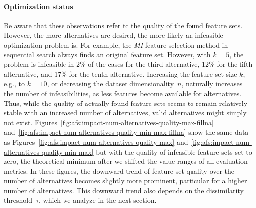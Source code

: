 \documentclass{article}
\theoremstyle{definition}
\begin{document}
\paragraph{Optimization status}

Be aware that these observations refer to the quality of the found feature sets.
However, the more alternatives are desired, the more likely an infeasible optimization problem is.
For example, the \emph{MI} feature-selection method in sequential search always finds an original feature set.
However, with $k=5$, the problem is infeasible in 2\% of the cases for the third alternative, 12\% for the fifth alternative, and 17\% for the tenth alternative.
Increasing the feature-set size $k$, e.g., to $k=10$, or decreasing the dataset dimensionality~$n$, naturally increases the number of infeasibilities, as less features become available for alternatives.
Thus, while the quality of actually found feature sets seems to remain relatively stable with an increased number of alternatives, valid alternatives might simply not exist.
Figures~\ref{fig:afs:impact-num-alternatives-quality-max-fillna} and~\ref{fig:afs:impact-num-alternatives-quality-min-max-fillna} show the same data as Figures~\ref{fig:afs:impact-num-alternatives-quality-max} and~\ref{fig:afs:impact-num-alternatives-quality-min-max} but with the quality of infeasible feature sets set to zero, the theoretical minimum after we shifted the value ranges of all evaluation metrics.
In these figures, the downward trend of feature-set quality over the number of alternatives becomes slightly more prominent, particular for a higher number of alternatives.
This downward trend also depends on the dissimilarity threshold~$\tau$, which we analyze in the next section.
\end{document}
